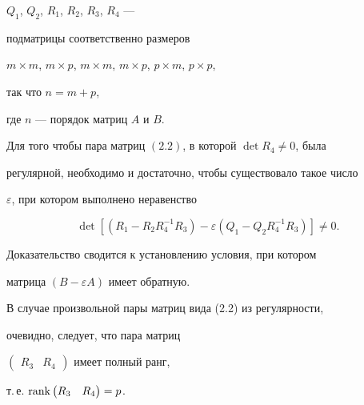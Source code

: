 $Q_1$, $Q_2$, $R_1$, $R_2$, $R_3$, $R_4$ --- 


подматрицы соответственно размеров 


$m\times m$, $m\times p$, $m\times m$, $m\times p$, $p\times m$, $p\times p$, 


так что $n=m+p$, 


где $n$ --- порядок матриц $A$ и $B$. 


 


 


\begin{thms} 


Для того чтобы пара матриц $(2.2)$, в которой $\det R_4\ne0$, была 


регулярной, необходимо и достаточно, чтобы существовало такое число 


$\varepsilon$, при котором выполнено неравенство 


\begin{equation} 


\det[(R_1-R_2R^{-1}_4R_3)-\varepsilon 


(Q_1-Q_2R^{-1}_4R_3)]\ne0. 


\end{equation} 


\end{thms} 


 


 


Доказательство сводится к установлению условия, при котором 


матрица $(B-\varepsilon A)$ имеет обратную. 


 


\begin{notes} 


В случае произвольной пары матриц вида (2.2) из регулярности, 


очевидно, следует, что пара матриц


$\begin{pmatrix}R_3 & R_4\end{pmatrix}$ имеет полный ранг, 


т.\,е. $\operatorname{rank}\begin{pmatrix}R_3 & R_4\end{pmatrix}=p$. 


\end{notes} 


 


